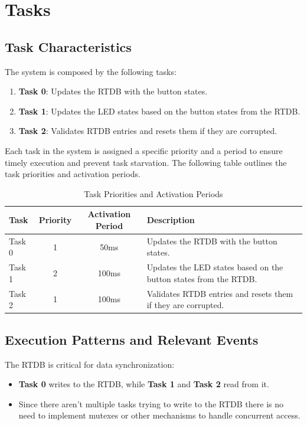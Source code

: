 \documentclass[a4paper,12pt]{article}
\begin{document}
\section{Tasks}
\subsection{Task Characteristics}
The system is composed by the following tasks:
\begin{enumerate}
    \item \textbf{Task 0}: Updates the RTDB with the button states.
    \item \textbf{Task 1}: Updates the LED states based on the button states from the RTDB.
    \item \textbf{Task 2}: Validates RTDB entries and resets them if they are corrupted.
\end{enumerate}

Each task in the system is assigned a specific priority and a period to ensure timely execution and prevent task starvation. The following table outlines the task priorities and activation periods.

\begin{table}[H]
    \centering
    \begin{tabular}{|l|c|c|p{5cm}|}
        \hline
        \textbf{Task} & \textbf{Priority} & \textbf{Activation Period} & \textbf{Description} \\
        \hline
        Task 0 & 1 & 50ms & Updates the RTDB with the button states. \\
        \hline
        Task 1 & 2 & 100ms & Updates the LED states based on the button states from the RTDB. \\
        \hline
        Task 2 & 1 & 100ms & Validates RTDB entries and resets them if they are corrupted. \\
        \hline
    \end{tabular}
    \caption{Task Priorities and Activation Periods}
    \label{tab:task_priorities}
\end{table}

\subsection{Execution Patterns and Relevant Events}
The RTDB is critical for data synchronization:
\begin{itemize}
    \item \textbf{Task 0} writes to the RTDB, while \textbf{Task 1} and \textbf{Task 2} read from it.
    \item Since there aren't multiple tasks trying to write to the RTDB there is no need to implement mutexes  or other mechanisms to handle concurrent access.
\end{itemize}
\end{document}
